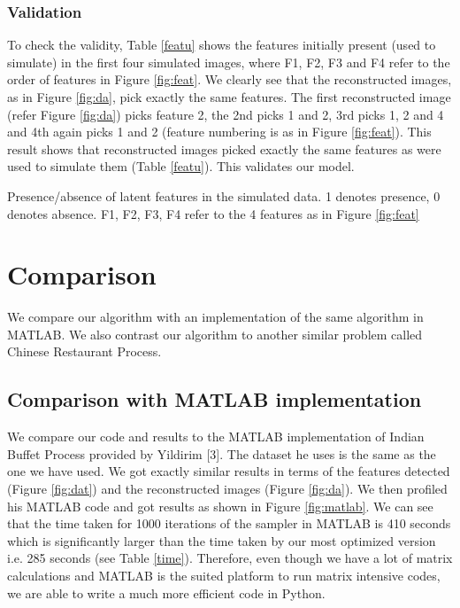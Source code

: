 \documentclass[11pt]{article}
\begin{document}
\subsubsection{Validation}
To check the validity, Table \ref{featu} shows the features initially present (used to simulate) in the first four simulated images, where F1, F2, F3 and F4 refer to the order of features in Figure \ref{fig:feat}. We clearly see that the reconstructed images, as in Figure \ref{fig:da}, pick exactly the same features. The first reconstructed image (refer Figure \ref{fig:da}) picks feature 2, the 2nd picks 1 and 2, 3rd picks 1, 2 and 4 and 4th again picks 1 and 2 (feature numbering is as in Figure \ref{fig:feat}). This result shows that reconstructed images picked exactly the same features as were used to simulate them (Table \ref{featu}). This validates our model. 

\begin{table}[ht]
\centering
\caption{Presence/absence of latent features in the simulated data. 1 denotes presence, 0 denotes absence. F1, F2, F3, F4 refer to the 4 features as in Figure \ref{fig:feat} \label{featu}}

\end{table}

\section{Comparison}
We compare our algorithm with an implementation of the same algorithm in MATLAB. We also contrast our algorithm to another similar problem called Chinese Restaurant Process.

\subsection{Comparison with MATLAB implementation}
We compare our code and results to the MATLAB implementation of Indian Buffet Process provided by Yildirim [3]. The dataset he uses is the same as the one we have used. We got exactly similar results in terms of the features detected (Figure \ref{fig:dat}) and the reconstructed images (Figure \ref{fig:da}). We then profiled his MATLAB code and got results as shown in Figure \ref{fig:matlab}. We can see that the time taken for 1000 iterations of the sampler in MATLAB is 410 seconds which is significantly larger than the time taken by our most optimized version i.e. 285 seconds (see Table \ref{time}). Therefore, even though we have a lot of matrix calculations and MATLAB is the suited platform to run matrix intensive codes, we are able to write a much more efficient code in Python.
\end{document}
